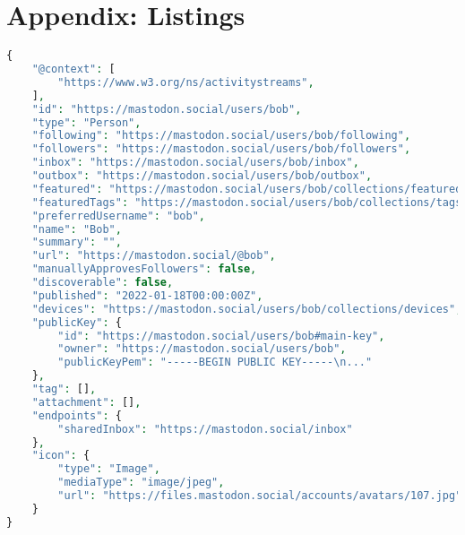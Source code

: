 \chapter{Appendix: Listings}

\lstset{style=JSONStyle}
\begin{lstlisting}[language=PHP, caption=Mastodon extended version of ActivityPub's actor object of user bob@mastodon.social, label=fig:mastodon_actor_object, float=ht]
{
    "@context": [
        "https://www.w3.org/ns/activitystreams",
    ],
    "id": "https://mastodon.social/users/bob",
    "type": "Person",
    "following": "https://mastodon.social/users/bob/following",
    "followers": "https://mastodon.social/users/bob/followers",
    "inbox": "https://mastodon.social/users/bob/inbox",
    "outbox": "https://mastodon.social/users/bob/outbox",
    "featured": "https://mastodon.social/users/bob/collections/featured",
    "featuredTags": "https://mastodon.social/users/bob/collections/tags",
    "preferredUsername": "bob",
    "name": "Bob",
    "summary": "",
    "url": "https://mastodon.social/@bob",
    "manuallyApprovesFollowers": false,
    "discoverable": false,
    "published": "2022-01-18T00:00:00Z",
    "devices": "https://mastodon.social/users/bob/collections/devices",
    "publicKey": {
        "id": "https://mastodon.social/users/bob#main-key",
        "owner": "https://mastodon.social/users/bob",
        "publicKeyPem": "-----BEGIN PUBLIC KEY-----\n..."
    },
    "tag": [],
    "attachment": [],
    "endpoints": {
        "sharedInbox": "https://mastodon.social/inbox"
    },
    "icon": {
        "type": "Image",
        "mediaType": "image/jpeg",
        "url": "https://files.mastodon.social/accounts/avatars/107.jpg"
    }
}
\end{lstlisting}


